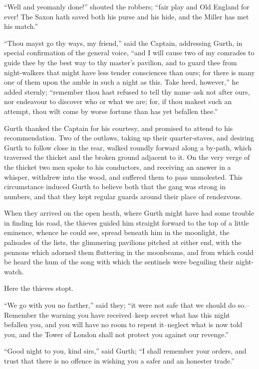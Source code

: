 ``Well and yeomanly done!'' shouted the robbers; ``fair play and Old
England for ever! The Saxon hath saved both his purse and his hide, and
the Miller has met his match.''

``Thou mayst go thy ways, my friend,'' said the Captain, addressing
Gurth, in special confirmation of the general voice, ``and I will cause
two of my comrades to guide thee by the best way to thy master's
pavilion, and to guard thee from night-walkers that might have less
tender consciences than ours; for there is many one of them upon the
amble in such a night as this. Take heed, however,'' he added sternly;
``remember thou hast refused to tell thy name--ask not after ours, nor
endeavour to discover who or what we are; for, if thou makest such an
attempt, thou wilt come by worse fortune than has yet befallen thee.''

Gurth thanked the Captain for his courtesy, and promised to attend to
his recommendation. Two of the outlaws, taking up their quarter-staves,
and desiring Gurth to follow close in the rear, walked roundly forward
along a by-path, which traversed the thicket and the broken ground
adjacent to it. On the very verge of the thicket two men spoke to his
conductors, and receiving an answer in a whisper, withdrew into the
wood, and suffered them to pass unmolested. This circumstance induced
Gurth to believe both that the gang was strong in numbers, and that they
kept regular guards around their place of rendezvous.

When they arrived on the open heath, where Gurth might have had some
trouble in finding his road, the thieves guided him straight forward to
the top of a little eminence, whence he could see, spread beneath him in
the moonlight, the palisades of the lists, the glimmering pavilions
pitched at either end, with the pennons which adorned them fluttering in
the moonbeams, and from which could be heard the hum of the song with
which the sentinels were beguiling their night-watch.

Here the thieves stopt.

``We go with you no farther,'' said they; ``it were not safe that we
should do so.--Remember the warning you have received--keep secret what
has this night befallen you, and you will have no room to repent
it--neglect what is now told you, and the Tower of London shall not
protect you against our revenge.''

``Good night to you, kind sirs,'' said Gurth; ``I shall remember your
orders, and trust that there is no offence in wishing you a safer and an
honester trade.''


